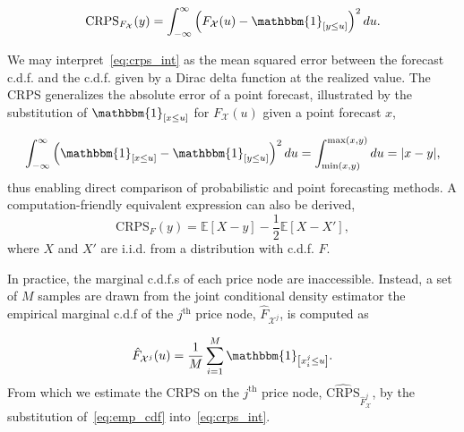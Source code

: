 \begin{equation}
    \text{CRPS}_{F_\mathcal{X}}(y) = \int_{-\infty}^{\infty} \left(F_\mathcal{X}(u) - \mathbbm{1}_{\left[ y \leq u \right]}\right)^2 du.
    \label{eq:crps_int}
\end{equation}

We may interpret~\eqref{eq:crps_int} as the mean squared error between the forecast c.d.f. and the c.d.f. given by a
Dirac delta function at the realized value.
The CRPS generalizes the absolute error of a point forecast, illustrated by the substitution of
$\mathbbm{1}_{\left[ x \leq u\right]}$ for $F_\mathcal{X}(u)$ given a point forecast $x$,

\begin{equation*}
    \int_{-\infty}^{\infty} \left(\mathbbm{1}_{\left[ x \leq u\right]} - \mathbbm{1}_{\left[ y \leq u \right]}\right)^2 du =
    \int_{\min(x, y)}^{\max(x, y)} du = |x - y|,
\end{equation*}
thus enabling direct comparison of probabilistic and point forecasting methods.
A computation-friendly equivalent expression can also be derived,
\begin{equation}
    \text{CRPS}_F(y) = \mathbb{E}\left[X - y\right] - \frac{1}{2}\mathbb{E} \left[X - X'\right],
    \label{eq:crps_num}
\end{equation}
where $X$ and $X'$ are i.i.d. from a distribution with c.d.f. $F$.

In practice, the marginal c.d.f.s of each price node are inaccessible.
Instead, a set of $M$ samples are drawn from the joint conditional density estimator the empirical marginal
c.d.f of the $j^{\text{th}}$ price node, $\hat{F}_{\mathcal{X}^j}$, is computed as

\begin{equation}
    \hat{F}_{\mathcal{X}^j}(u) = \frac{1}{M} \sum_{i=1}^M \mathbbm{1}_{\left[ x_i^j \leq u \right]}
    \label{eq:emp_cdf}.
\end{equation}
From which we estimate the CRPS on the $j^{\text{th}}$ price node, $\widehat{\text{CRPS}}_{\hat{F}_\mathcal{X}^j}$, by
the substitution of~\eqref{eq:emp_cdf} into~\eqref{eq:crps_int}\footnotemark.


